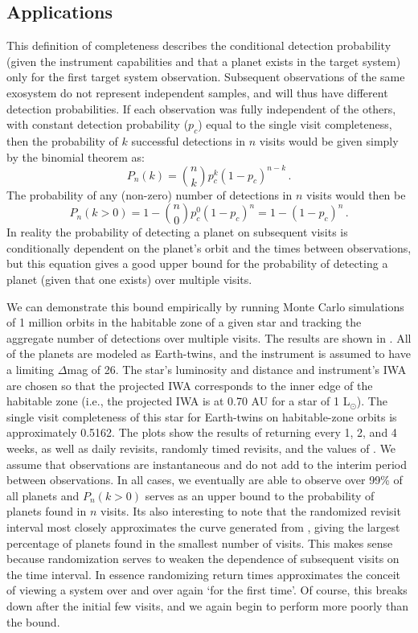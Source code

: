 \subsection{Applications}\label{sec:completeness_apps}
This definition of completeness describes the conditional detection probability (given the instrument capabilities and that a planet exists in the target system) only for the first target system observation.  Subsequent observations of the same exosystem do not represent independent samples, and will thus have different detection probabilities.  If each observation was fully independent of the others, with constant detection probability ($p_c$) equal to the single visit completeness, then the probability of $k$ successful detections in $n$ visits would be  given simply by the binomial theorem as:
\begin{equation}
P_n(k) = \binom{n}{k} p_c^k (1-p_c)^{n-k} \, .
\end{equation}
The probability of any (non-zero) number of detections in $n$ visits would then be
\begin{equation} \label{eq:multvisit_detprob}
P_n(k>0) = 1 -  \binom{n}{0}  p_c^0 (1-p_c)^{n} = 1 - (1-p_c)^n\, .
\end{equation}
In reality the probability of detecting a planet on subsequent visits is conditionally dependent on the planet's orbit and the times between observations, but this equation gives a good upper bound for the probability of detecting a planet (given that one exists) over multiple visits.  

We can demonstrate this bound empirically by running Monte Carlo simulations of 1 million orbits in the habitable zone of a given star and tracking the aggregate number of detections over multiple visits.  The results are shown in .  All of the planets are modeled as Earth-twins, and the instrument is assumed to have a limiting $\Delta$mag of 26.  The star's luminosity and distance and instrument's IWA  are chosen so that the projected IWA corresponds to the inner edge of the habitable zone (i.e., the projected IWA is at 0.70 AU for a star of 1 L$_\odot$).  The single visit completeness of this star for Earth-twins on habitable-zone orbits is approximately 0.5162.  The plots show the results of returning every 1, 2, and 4 weeks, as well as daily revisits, randomly timed revisits, and the values of .  We assume that observations are instantaneous and do not add to the interim period between observations.  In all cases, we eventually are able to observe over 99\% of all planets and $P_n(k >0)$ serves as an upper bound to the probability of planets found in $n$ visits.  Its also interesting to note that the randomized revisit interval most closely approximates the curve generated from , giving the largest percentage of planets found in the smallest number of visits.  This makes sense because randomization serves to weaken the dependence of subsequent visits on the time interval.  In essence randomizing return times approximates the conceit of viewing a system over and over again `for the first time'.  Of course, this breaks down after the initial few visits, and we again begin to perform more poorly than the bound.

